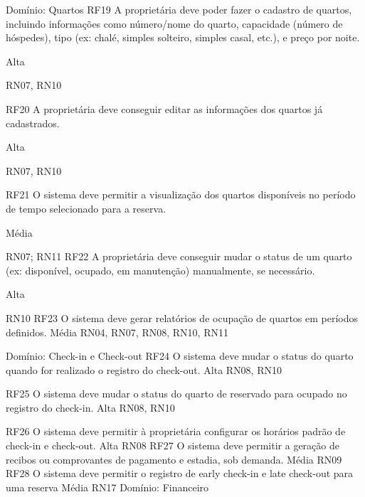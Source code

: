 Domínio: Quartos 
RF19
A proprietária deve poder fazer o cadastro de quartos, incluindo informações como número/nome do quarto, capacidade (número de hóspedes), tipo (ex: chalé, simples solteiro, simples casal, etc.), e preço por noite.










Alta




RN07, RN10




RF20
A proprietária deve conseguir editar as informações dos quartos já cadastrados.




Alta


RN07, RN10




RF21
O sistema deve permitir a visualização dos quartos disponíveis no período de tempo selecionado para a reserva.






Média






RN07; RN11
RF22
A proprietária deve conseguir mudar o status de um quarto (ex: disponível, ocupado, em manutenção) manualmente, se necessário.








Alta






RN10 
RF23
O sistema deve gerar relatórios de ocupação de quartos em períodos definidos.
Média
RN04, RN07, RN08, RN10, RN11


Domínio: Check-in e Check-out
RF24
O sistema deve mudar o status do quarto quando for realizado o registro do check-out.
Alta
RN08, RN10




RF25
O sistema deve mudar o status do quarto de reservado para ocupado no registro do check-in.
Alta
RN08, RN10






RF26
O sistema deve permitir à proprietária configurar os horários padrão de check-in e check-out.
Alta
RN08
RF27
O sistema deve permitir a geração de recibos ou comprovantes de pagamento e estadia, sob demanda.
Média
RN09
RF28
O sistema deve permitir o registro de early check-in e late check-out para uma reserva
Média
RN17
Domínio: Financeiro




